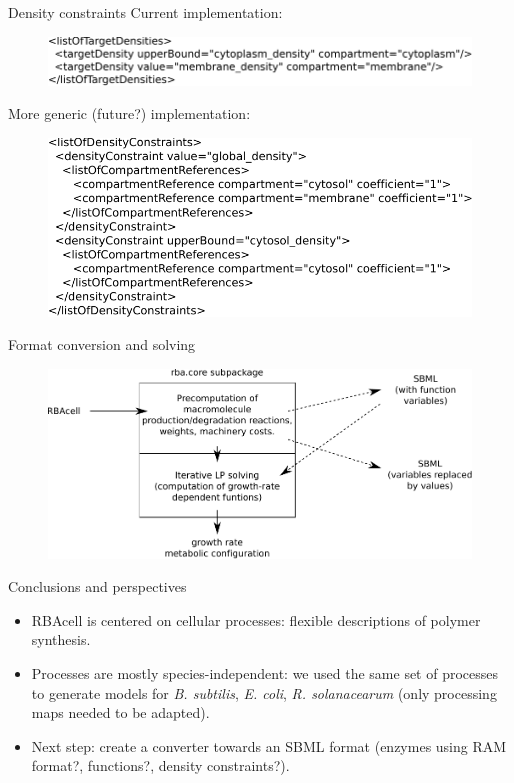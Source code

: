 \documentclass{beamer}
\begin{document}
\begin{frame}{Density constraints}
  Current implementation:
  \begin{figure}
    \centering
    \includegraphics[width=\linewidth]{density}
  \end{figure}
  More generic (future?) implementation:
  \begin{figure}
    \centering
    \includegraphics[width=\linewidth]{density_future}
  \end{figure}
\end{frame}

\begin{frame}{Format conversion and solving}
  \begin{figure}
    \centering
    \includegraphics[width=\linewidth]{solving}
  \end{figure}
\end{frame}

\begin{frame}{Conclusions and perspectives}
  \begin{itemize}
    \item RBAcell is centered on cellular processes: flexible descriptions
    of polymer synthesis.
    \item Processes are mostly species-independent: we used the same set of processes to
    generate models for \textit{B. subtilis}, \textit{E. coli}, \textit{R. solanacearum}
    (only processing maps needed to be adapted).
    \item Next step: create a converter towards an SBML format
    (enzymes using RAM format?, functions?, density constraints?).
  \end{itemize}
\end{frame}

\appendix
{}
\setcounter{finalframe}{\value{framenumber}}


\setcounter{framenumber}{\value{finalframe}}
\end{document}
